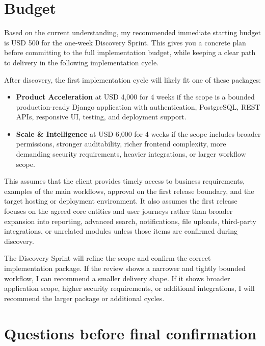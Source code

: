 \documentclass[11pt,a4paper]{article}
\begin{document}
\section*{Budget}

Based on the current understanding, my recommended immediate starting budget is USD 500 for the one-week Discovery Sprint. This gives you a concrete plan before committing to the full implementation budget, while keeping a clear path to delivery in the following implementation cycle.\par

After discovery, the first implementation cycle will likely fit one of these packages:\par

\begin{itemize}
\item \textbf{Product Acceleration} at USD 4,000 for 4 weeks if the scope is a bounded production-ready Django application with authentication, PostgreSQL, REST APIs, responsive UI, testing, and deployment support.
\item \textbf{Scale \& Intelligence} at USD 6,000 for 4 weeks if the scope includes broader permissions, stronger auditability, richer frontend complexity, more demanding security requirements, heavier integrations, or larger workflow scope.
\end{itemize}

This assumes that the client provides timely access to business requirements, examples of the main workflows, approval on the first release boundary, and the target hosting or deployment environment. It also assumes the first release focuses on the agreed core entities and user journeys rather than broader expansion into reporting, advanced search, notifications, file uploads, third-party integrations, or unrelated modules unless those items are confirmed during discovery.\par

The Discovery Sprint will refine the scope and confirm the correct implementation package. If the review shows a narrower and tightly bounded workflow, I can recommend a smaller delivery shape. If it shows broader application scope, higher security requirements, or additional integrations, I will recommend the larger package or additional cycles.\par

\section*{Questions before final confirmation}
\end{document}
